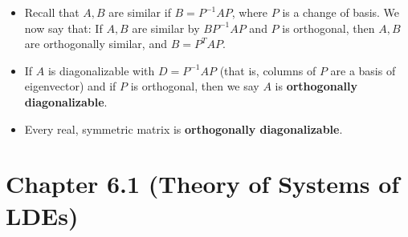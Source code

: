 \documentclass[10pt,letterpaper]{article}
\begin{document}
\begin{itemize}
\item Recall that $A, B$ are similar if $B=P^{-1}AP$, where $P$ is a change of basis. We now say that: 
If $A,B$ are similar by $BP^{-1}AP$ and $P$ is orthogonal, then $A, B$ are orthogonally similar, and $B=P^TAP$. 
\item If $A$ is diagonalizable with $D=P^{-1}AP$ (that is, columns of $P$ are a basis of eigenvector) and if $P$ is orthogonal, then we say $A$ is \textbf{orthogonally diagonalizable}. 

\item Every real, symmetric matrix is \textbf{orthogonally diagonalizable}. 
\end{itemize}

\section*{}

\section*{Chapter 6.1 (Theory of Systems of LDEs)}
\end{document}
